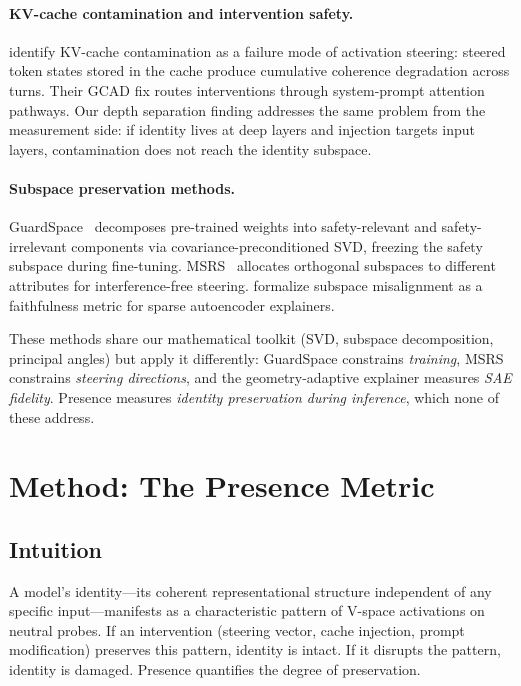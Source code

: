 \documentclass[11pt,a4paper]{article}
\begin{document}
\paragraph{KV-cache contamination and intervention safety.}
\citet{kang2026promptactivation} identify KV-cache contamination as a failure
mode of activation steering: steered token states stored in the cache produce
cumulative coherence degradation across turns. Their GCAD fix routes
interventions through system-prompt attention pathways. Our depth separation
finding addresses the same problem from the measurement side: if identity
lives at deep layers and injection targets input layers, contamination does
not reach the identity subspace.

\paragraph{Subspace preservation methods.}
GuardSpace~\citep{zhang2025guardspace} decomposes pre-trained weights into
safety-relevant and safety-irrelevant components via covariance-preconditioned
SVD, freezing the safety subspace during fine-tuning.
MSRS~\citep{jiang2025msrs} allocates orthogonal subspaces to different
attributes for interference-free steering.
\citet{lim2026geometry} formalize subspace misalignment as a faithfulness
metric for sparse autoencoder explainers.

These methods share our mathematical toolkit (SVD, subspace decomposition,
principal angles) but apply it differently: GuardSpace constrains
\emph{training}, MSRS constrains \emph{steering directions}, and the
geometry-adaptive explainer measures \emph{SAE fidelity}. Presence measures
\emph{identity preservation during inference}, which none of these address.

\section{Method: The Presence Metric}
\label{sec:method}

\subsection{Intuition}

A model's identity---its coherent representational structure independent of
any specific input---manifests as a characteristic pattern of V-space
activations on neutral probes. If an intervention (steering vector, cache
injection, prompt modification) preserves this pattern, identity is intact.
If it disrupts the pattern, identity is damaged. Presence quantifies the
degree of preservation.
\end{document}
